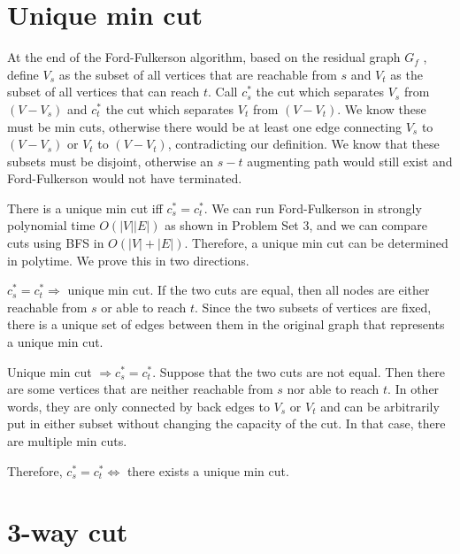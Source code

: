 \documentclass[12pt]{article}
\begin{document}
\pagebreak

\section{Unique min cut}

At the end of the Ford-Fulkerson algorithm, based on the residual graph $G_f$
, define $V_s$ as the subset of
all vertices that are reachable from $s$ and $V_t$ as the
subset of all vertices that can reach $t$.
Call $c_s^*$ the cut which separates $V_s$ from $(V - V_s)$
and $c_t^*$ the cut which separates $V_t$ from $(V - V_t)$.
We know these must be min cuts, otherwise there would be at least one edge
connecting $V_s$ to $(V - V_s)$ or $V_t$ to $(V - V_t)$, contradicting our
definition. We know that these subsets must be disjoint, otherwise an
$s-t$ augmenting path would still exist and Ford-Fulkerson would not have
terminated.

There is a unique min cut iff $c_s^* = c_t^*$. We can run
Ford-Fulkerson in strongly polynomial time $O(|V||E|)$ as shown in
Problem Set 3, and we can compare cuts using BFS in $O(|V|+|E|)$.
Therefore, a unique min cut can be determined in polytime.
We prove this in two directions.

$c_s^* = c_t^* \Rightarrow $ unique min cut.
If the two cuts are equal, then all nodes are either
reachable from $s$ or able to reach $t$. Since the two subsets of vertices
are fixed, there is a unique set of edges between them in the original
graph that represents a unique min cut.

Unique min cut $\Rightarrow c_s^* = c_t^*$.
Suppose that the two cuts are not equal. Then there are some vertices that
are neither reachable from $s$ nor able to reach $t$. In other words,
they are only connected by back edges to $V_s$ or $V_t$ and can be
arbitrarily put in either subset without changing the capacity of the cut.
In that case, there are multiple min cuts.

Therefore, $c_s^* = c_t^* \Leftrightarrow $ there exists a unique min cut.

\pagebreak

\section{3-way cut}
\end{document}
